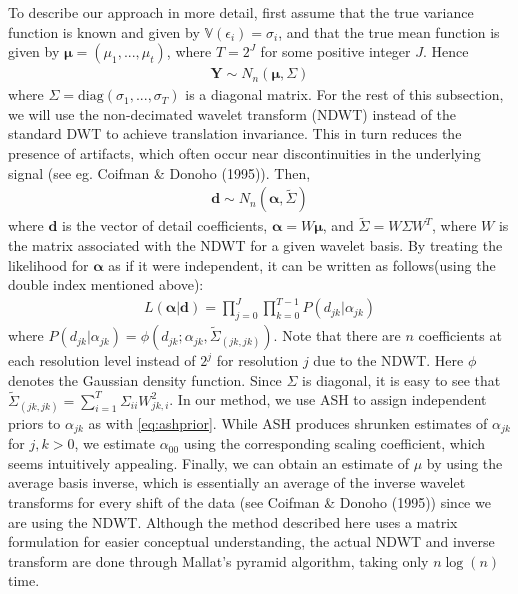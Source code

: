 \documentclass[12pt]{article}
\newcommand{\Ga}{\alpha}
\newcommand{\Ge}{\epsilon}
\newcommand{\s}{\sigma}
\begin{document}
To describe our approach in more detail, first assume that the true variance function is known and given by $\mathbb{V}(\Ge_i)=\s_i$, and that the true mean function is given by $\bm{\mu}=(\mu_1,...,\mu_t)$, where $T=2^J$ for some positive integer $J$. Hence
\begin{eqnarray}
\bm{Y}\sim N_n(\bm{\mu},\Sigma)
\end{eqnarray}
where $\Sigma=\textrm{diag}(\s_1,...,\s_T)$ is a diagonal matrix. For the rest of this subsection, we will use the non-decimated wavelet transform (NDWT) instead of the standard DWT to achieve translation invariance. This in turn reduces the presence of artifacts, which often occur near discontinuities in the underlying signal (see eg. Coifman \& Donoho (1995)). Then,
\begin{eqnarray}
\bm{d}\sim N_n(\bm{\Ga},\tilde{\Sigma})
\end{eqnarray}
where $\bm{d}$ is the vector of detail coefficients, $\bm{\Ga}=W\bm{\mu}$, and $\tilde{\Sigma}=W\Sigma W^T$, where $W$ is the matrix associated with the NDWT for a given wavelet basis. By treating the likelihood for $\bm{\Ga}$ as if it were independent, it can be written as follows(using the double index mentioned above):
\begin{eqnarray}\label{eq:likelihood}
L(\bm{\Ga}|\bm{d})=\prod_{j=0}^J\prod_{k=0}^{T-1}P(d_{jk}|\Ga_{jk})
\end{eqnarray}
where $P(d_{jk}|\Ga_{jk})=\phi(d_{jk};\Ga_{jk},\tilde{\Sigma}_{(jk,jk)})$. Note that there are $n$ coefficients at each resolution level instead of $2^j$ for resolution $j$ due to the NDWT. Here $\phi$ denotes the Gaussian density function. Since $\Sigma$ is diagonal, it is easy to see that $\tilde{\Sigma}_{(jk,jk)}=\sum_{i=1}^T \Sigma_{ii}W_{jk,i}^2$. In our method, we use ASH to assign independent priors to $\Ga_{jk}$ as with \eqref{eq:ashprior}. %
While ASH produces shrunken estimates of $\Ga_{jk}$ for $j,k>0$, we estimate $\Ga_{00}$ using the corresponding scaling coefficient, which seems intuitively appealing. Finally, we can obtain an estimate of $\mu$ by using the average basis inverse, which is essentially an average of the inverse wavelet transforms for every shift of the data (see Coifman \& Donoho (1995)) since we are using the NDWT. Although the method described here uses a matrix formulation for easier conceptual understanding, the actual NDWT and inverse transform are done through Mallat's pyramid algorithm, taking only $n\log(n)$ time.
\end{document}

